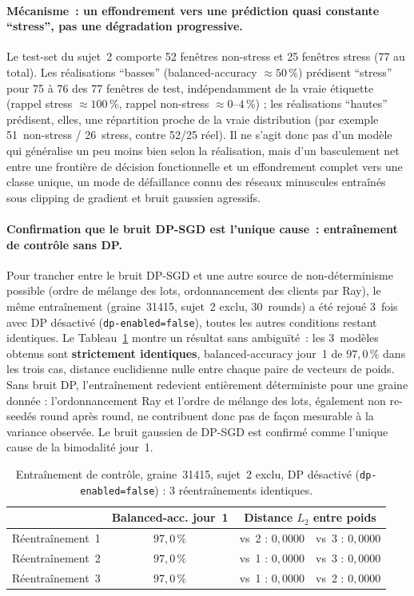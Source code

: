 \documentclass{acmart}
\begin{document}
\paragraph{Mécanisme~: un effondrement vers une prédiction quasi constante
``stress'', pas une dégradation progressive.} Le test-set du sujet~2
comporte 52 fenêtres non-stress et 25 fenêtres stress (77 au total). Les
réalisations ``basses'' (balanced-accuracy $\approx 50\,\%$) prédisent
``stress'' pour 75 à 76 des 77 fenêtres de test, indépendamment de la vraie
étiquette (rappel stress $\approx 100\,\%$, rappel non-stress
$\approx 0$--$4\,\%$) ; les réalisations ``hautes'' prédisent, elles, une
répartition proche de la vraie distribution (par exemple 51~non-stress /
26~stress, contre 52/25 réel). Il ne s'agit donc pas d'un modèle qui
généralise un peu moins bien selon la réalisation, mais d'un basculement net
entre une frontière de décision fonctionnelle et un effondrement complet
vers une classe unique, un mode de défaillance connu des réseaux minuscules
entraînés sous clipping de gradient et bruit gaussien agressifs.

\paragraph{Confirmation que le bruit DP-SGD est l'unique cause~: entraînement
de contrôle sans DP.} Pour trancher entre le bruit DP-SGD et une autre
source de non-déterminisme possible (ordre de mélange des lots,
ordonnancement des clients par Ray), le même entraînement (graine~31415,
sujet~2 exclu, 30~rounds) a été rejoué 3~fois avec DP désactivé
(\texttt{dp-enabled=false}), toutes les autres conditions restant
identiques. Le Tableau~\ref{tab:no_dp_control} montre un résultat sans
ambiguïté~: les 3~modèles obtenus sont \textbf{strictement identiques},
balanced-accuracy jour~1 de $97{,}0\,\%$ dans les trois cas, distance
euclidienne nulle entre chaque paire de vecteurs de poids. Sans bruit DP,
l'entraînement redevient entièrement déterministe pour une graine donnée :
l'ordonnancement Ray et l'ordre de mélange des lots, également non
re-seedés round après round, ne contribuent donc pas de façon mesurable à
la variance observée. Le bruit gaussien de DP-SGD est confirmé comme
l'unique cause de la bimodalité jour~1.

\begin{table}[h!]
  \centering
  \small
  \caption{Entraînement de contrôle, graine~31415, sujet~2 exclu, DP
  désactivé (\texttt{dp-enabled=false}) : 3 réentraînements identiques.}
  \label{tab:no_dp_control}
  \begin{tabular}{cccc}
    \toprule
     & Balanced-acc. jour~1 & \multicolumn{2}{c}{Distance $L_2$ entre poids} \\
    \midrule
    Réentraînement~1 & $97{,}0\,\%$ & vs~2 : $0{,}0000$ & vs~3 : $0{,}0000$ \\
    Réentraînement~2 & $97{,}0\,\%$ & vs~1 : $0{,}0000$ & vs~3 : $0{,}0000$ \\
    Réentraînement~3 & $97{,}0\,\%$ & vs~1 : $0{,}0000$ & vs~2 : $0{,}0000$ \\
    \bottomrule
  \end{tabular}
\end{table}
\end{document}
